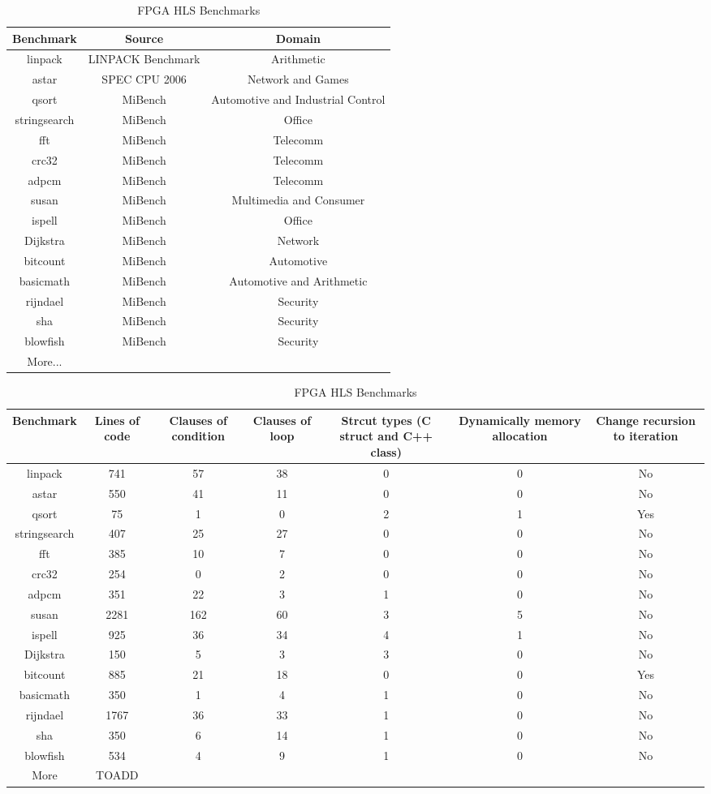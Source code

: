 \documentclass[conference]{IEEEtran}
\begin{document}
\begin{table}
\caption{FPGA HLS Benchmarks}\label{table_benchmark}
\begin{tabular}{|c|c|c|}
\hline
Benchmark  & Source & Domain\tabularnewline
\hline
\hline
linpack & LINPACK Benchmark & Arithmetic\tabularnewline
\hline
astar & SPEC CPU 2006 & Network and Games\tabularnewline
\hline
qsort & MiBench & Automotive and Industrial Control\tabularnewline
\hline
stringsearch & MiBench & Office\tabularnewline
\hline
fft & MiBench & Telecomm\tabularnewline
\hline
crc32 & MiBench & Telecomm\tabularnewline
\hline
adpcm  & MiBench & Telecomm\tabularnewline
\hline
susan & MiBench & Multimedia and Consumer\tabularnewline
\hline
ispell & MiBench & Office\tabularnewline
\hline
Dijkstra & MiBench & Network\tabularnewline
\hline
bitcount & MiBench & Automotive\tabularnewline
\hline
basicmath & MiBench & Automotive and Arithmetic\tabularnewline
\hline
rijndael & MiBench & Security\tabularnewline
\hline
sha & MiBench & Security\tabularnewline
\hline
blowfish & MiBench & Security\tabularnewline
\hline
More... &  & \tabularnewline
\hline
\end{tabular}
\end{table}




\begin{table*}[!t]
\caption{FPGA HLS Benchmarks}\label{table_benchmark2}
\begin{tabular}{|c|c|c|c|c|c|c|}
\hline
Benchmark  & Lines of code & Clauses of condition & Clauses of loop & Strcut types (C struct and C++ class) & Dynamically memory allocation & Change recursion to iteration\tabularnewline
\hline
\hline
linpack & 741 & 57 & 38 & 0 & 0 & No\tabularnewline
\hline
astar & 550 & 41 & 11 & 0 & 0 & No\tabularnewline
\hline
qsort & 75 & 1 & 0 & 2 & 1 & Yes\tabularnewline
\hline
stringsearch & 407 & 25 & 27 & 0 & 0 & No\tabularnewline
\hline
fft & 385 & 10 & 7 & 0 & 0 & No\tabularnewline
\hline
crc32 & 254 & 0 & 2 & 0 & 0 & No\tabularnewline
\hline
adpcm  & 351 & 22 & 3 & 1 & 0 & No\tabularnewline
\hline
susan & 2281 & 162 & 60 & 3 & 5 & No\tabularnewline
\hline
ispell & 925 & 36 & 34 & 4 & 1 & No\tabularnewline
\hline
Dijkstra & 150 & 5 & 3 & 3 & 0 & No\tabularnewline
\hline
bitcount & 885 & 21 & 18 & 0 & 0 & Yes\tabularnewline
\hline
basicmath & 350 & 1 & 4 & 1 & 0 & No\tabularnewline
\hline
rijndael & 1767 & 36 & 33 & 1 & 0 & No\tabularnewline
\hline
sha & 350 & 6 & 14 & 1 & 0 & No\tabularnewline
\hline
blowfish & 534 & 4 & 9 & 1 & 0 & No\tabularnewline
\hline
More & TOADD &  &  &  &  & \tabularnewline
\hline
\end{tabular}

\end{table*}
\end{document}
